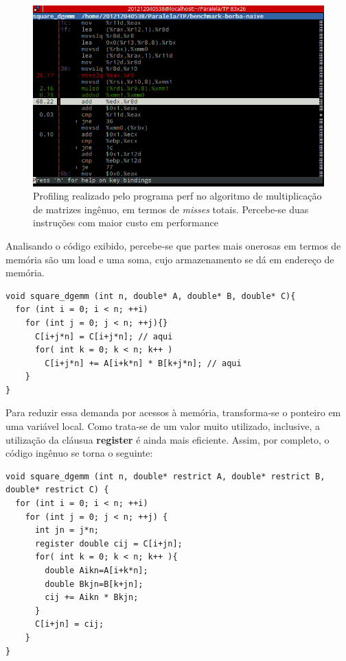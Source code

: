 \documentclass[a4paper,10pt]{article}
\begin{document}
\begin{figure}[H]
    \begin{center} 
        \includegraphics[scale=0.5]{images/perf_mem}
    \end{center}
    \caption{Profiling realizado pelo programa perf no algoritmo de multiplicação de matrizes ingênuo, em termos de \textit{misses} totais. Percebe-se duas instruções com maior custo em performance }
    \label{fig:perf_mem}
\end{figure}

Analisando o código exibido, percebe-se que  partes mais onerosas em termos de memória são um load e uma soma, cujo armazenamento se dá em endereço de memória.

\begin{lstlisting}
void square_dgemm (int n, double* A, double* B, double* C){
  for (int i = 0; i < n; ++i)
    for (int j = 0; j < n; ++j){}
      C[i+j*n] = C[i+j*n]; // aqui
      for( int k = 0; k < n; k++ )
        C[i+j*n] += A[i+k*n] * B[k+j*n]; // aqui
    }
}
\end{lstlisting}

Para reduzir essa demanda por acessos à memória, transforma-se o ponteiro em uma variável local. Como trata-se de um valor muito utilizado, inclusive, a utilização da cláusua \textbf{register} é ainda mais eficiente. Assim, por completo, o código ingênuo se torna o seguinte:


\begin{lstlisting}
void square_dgemm (int n, double* restrict A, double* restrict B, double* restrict C) {
  for (int i = 0; i < n; ++i)
    for (int j = 0; j < n; ++j) {
      int jn = j*n;
      register double cij = C[i+jn];
      for( int k = 0; k < n; k++ ){
        double Aikn=A[i+k*n];
        double Bkjn=B[k+jn];
        cij += Aikn * Bkjn;
      }
      C[i+jn] = cij;
    }
}
\end{lstlisting}
\end{document}
